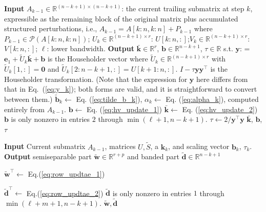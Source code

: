 \documentclass[a4paper,fleqn]{cas-sc}
\def\bfy{{\mathbf y}}
\def\bfe{{\mathbf e}}
\def\bfb{{\mathbf b}}
\def\bfw{{\mathbf w}}
\begin{document}
\begin{algorithm}
\caption{FormHouseholderVector}
\label{algo:form_householder}
\begin{algorithmic}
\State \textbf{Input} $A_{k-1} \in \mathbb{R}^{(n-k+1) \times (n-k+1)}$: the current trailing submatrix at step $k$, expressible as the remaining block of the original matrix plus accumulated structured perturbations, i.e., $A_{k-1} = A[k:n, k:n] + P_{k-1}$ where $P_{k-1} \in \mathcal{P}(A[k:n, k:n])$;
$U_k \in \mathbb{R}^{(n-k+1) \times r}$: $U[k:n, :]$;$V_k \in \mathbb{R}^{(n-k+1) \times r}$: $V[k:n, :]$;
$\ell$: lower bandwidth.
\State \textbf{Output} $\bar{\mathbf{k}} \in \mathbb{R}^r$, $\mathbf{b} \in \mathbb{R}^{n-k+1}$, $\tau\in \mathbb{R}$ s.t. $\bfy$: = $ \bfe_1 + \tilde U_k\bar{\mathbf{k}} + \mathbf{b}$ is the Householder vector where $\tilde U_k \in \mathbb{R}^{(n-k+1) \times r}$ with $\tilde U_k[1,:]=\mathbf{0}$ and $\tilde U_k[2:n-k+1,:]=U[k+1:n,:]$. $I-\tau \bfy \bfy^\top$ is the Householder transformation. (Note that the expression for $\bfy$ here differs from that in Eq.~(\ref{eq:y_k}); both forms are valid, and it is straightforward to convert between them.)
\State $\tilde \bfb_k \gets $ Eq. (\ref{eq:tilde_b_k}), 
\State $\alpha_k \gets $ Eq. (\ref{eq:alpha_k}), computed entirely from $A_{k-1}$.
\State $\mathbf{b} \gets $ Eq. (\ref{eq:hv_update_1})
\State $\bar{\mathbf{k}} \gets $ Eq. (\ref{eq:hv_update_2}) 
\State $\mathbf{b}$ is only nonzero in entries $2$ through $\min(\ell+1, n-k+1)$.
\State $\tau \gets 2/\bfy^\top\bfy$
\State \Return $\bar{\mathbf{k}}$, $\mathbf{b}$, $\tau$
\end{algorithmic}
\end{algorithm}

\begin{algorithm}
\caption{ComputeRowUpdate}
\label{algo:compute_row}
\begin{algorithmic}
\State \textbf{Input} Current submatrix $A_{k-1}$,
  matrices $U, \tilde S$, a
$\mathbf{k}_{k}$, and scaling vector $\mathbf{b}_{k}$, $\tau_k$.
\State \textbf{Output} semiseparable part $\tilde \bfw \in \mathbb{R}^{r+p}$ and banded part $\tilde{\mathbf{d}} \in \mathbb{R}^{n-k+1}$ 

\State $\tilde \bfw^\top \gets $ Eq.(\ref{eq:row_updtae_1})

\State $\tilde{\mathbf{d}}^\top \gets $ Eq.(\ref{eq:row_updtae_2})
\State $\tilde{\mathbf{d}}$ is only nonzero in entries $1$ through $\min(\ell+m+1, n-k+1)$.
\State \Return $\tilde \bfw, \tilde{\mathbf{d}}$
\end{algorithmic}
\end{algorithm}
\end{document}

